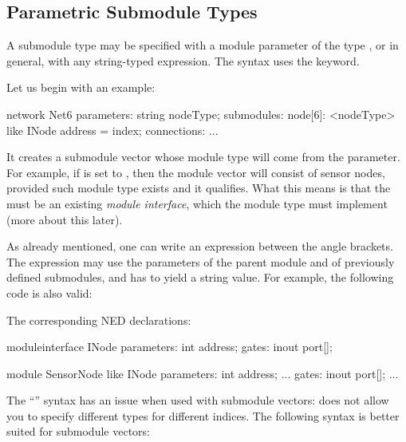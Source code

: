 \subsection{Parametric Submodule Types}
\label{sec:ch-ned-lang:submodule-like}

A submodule type may be specified with a module parameter of the type
, or in general, with any string-typed expression.
The syntax uses the  keyword.

Let us begin with an example:

\begin{ned}
network Net6
{
    parameters:
        string nodeType;
    submodules:
        node[6]: <nodeType> like INode {
            address = index;
        }
    connections:
        ...
}
\end{ned}

It creates a submodule vector whose module type will come from the
 parameter. For example, if  is set to ,
then the module vector will consist of sensor nodes, provided such module
type exists and it qualifies. What this means is that the  must be
an existing \textit{module interface}, which the 
module type must implement (more about this later).

As already mentioned, one can write an expression between the angle
brackets. The expression may use the parameters of the parent module and of
previously defined submodules, and has to yield a string value. For
example, the following code is also valid:

\begin{ned}
network Net6
{
    parameters:
        string nodeTypePrefix;
        int variant;
    submodules:
        node[6]: <nodeTypePrefix + "Node" + string(variant)> like INode {
           ...
}
\end{ned}

The corresponding NED declarations:

\begin{ned}
moduleinterface INode
{
    parameters:
        int address;
    gates:
        inout port[];
}

module SensorNode like INode
{
    parameters:
        int address;
        ...
    gates:
        inout port[];
        ...
}
\end{ned}

The ``'' syntax has an issue when used
with submodule vectors: does not allow you to specify different types
for different indices. The following syntax is better suited for
submodule vectors:

